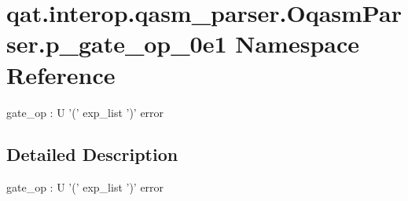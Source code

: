\hypertarget{namespaceqat_1_1interop_1_1qasm__parser_1_1OqasmParser_1_1p__gate__op__0e1}{\section{qat.\-interop.\-qasm\-\_\-parser.\-Oqasm\-Parser.\-p\-\_\-gate\-\_\-op\-\_\-0e1 Namespace Reference}
\label{namespaceqat_1_1interop_1_1qasm__parser_1_1OqasmParser_1_1p__gate__op__0e1}
}


gate\-\_\-op \-: U '(' exp\-\_\-list ')' error  




\subsection{Detailed Description}
gate\-\_\-op \-: U '(' exp\-\_\-list ')' error 